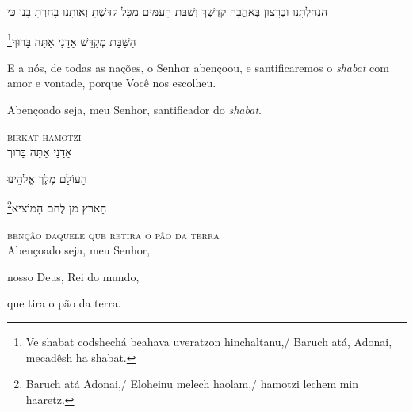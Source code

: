 הִנְחַלְתָּנוּ וּבְרָצון בְּאַהֲבָה קָדְשְׁךָ וְשַׁבַּת הָעַמִּים מִכָּל קִדַּשְׁתָּ וְאותָנוּ בָחַרְתָּ בָנוּ כִּי

\footnote{Ve shabat codshechá beahava uveratzon hinchaltanu,/
Baruch atá, Adonai, mecadêsh ha shabat.}הַשַּׁבָּת מְקַדֵּשׁ אַדָנָי אַתָּה בָּרוּךְ

\movetooddpage
\raggedright

\vspace*{1cm}

E a nós, de todas as nações, o Senhor abençoou, e santificaremos o \textit{shabat} com amor e vontade, porque 
Você nos escolheu.\medskip

Abençoado seja, meu Senhor, santificador do \textit{shabat}.

\movetoevenpage
\raggedleft


\vspace*{1cm}

\textsc{birkat hamotzi}\\[15pt]

אַדָנָי אַתָּה בָּרוּך

הָעוֹלָם מֶלֶך אֱלהֵינוּ 

\footnote{Baruch atá Adonai,/ Eloheinu melech haolam,/ hamotzi lechem min haaretz.}הַארץ מן לֶחם הָמוֹציא

\movetooddpage
\raggedright


\textsc{benção daquele que retira o pão da terra}\\[15pt]

Abençoado seja, meu Senhor,

nosso Deus, Rei do mundo,

que tira o pão da terra.

